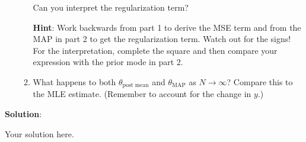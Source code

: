\documentclass[submit]{../harvardml}
\newenvironment{solution}{
    \vspace{2mm}
    \color{blue}\noindent\textbf{Solution}:
}{}
\begin{document}
\begin{framed}
\begin{enumerate}
\begin{enumerate}
              Can you interpret the regularization term?

              \textbf{Hint}: Work backwards from part 1 to derive the MSE term and from the MAP in part 2 to get the regularization term. Watch out for the signs! For the interpretation, complete the square and then compare your expression with the prior mode in part 2.
        \item
              What happens to both $\theta_{\text{post mean}}$ and $\theta_{\text{MAP}}$ as \(N \to \infty\)? Compare this to the MLE estimate.
              (Remember to account for the change in \(y\).)
      \end{enumerate}

  \end{enumerate}

\end{framed}

\begin{solution}
	Your solution here.
\end{solution}


\newpage

\end{document}
